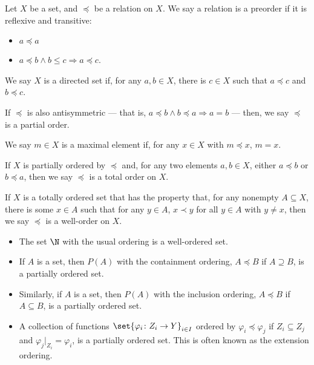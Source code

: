 \begin{definition}
Let $X$ be a set, and $\preceq $ be a relation on $X$. We say a relation is a preorder if it is reflexive and transitive:
\begin{itemize}
  \item $a\preceq a$
  \item $a\preceq b \wedge b\leq c\Rightarrow a\preceq c$.
\end{itemize}
We say $X$ is a directed set if, for any $a,b\in X$, there is $c\in X$ such that $a\preceq c$ and $b\preceq c$.\newline

If $\preceq$ is also antisymmetric --- that is, $a\preceq b\wedge b\preceq a \Rightarrow a = b$ --- then, we say $\preceq$ is a partial order.\newline

We say $m\in X$ is a maximal element if, for any $x\in X$ with $m\preceq x$, $m = x$.\newline

If $X$ is partially ordered by $\preceq$ and, for any two elements $a,b\in X$, either $a\preceq b$ or $b\preceq a$, then we say $\preceq$ is a total order on $X$.\newline

If $X$ is a totally ordered set that has the property that, for any nonempty $A\subseteq X$, there is some $x\in A$ such that for any $y\in A$, $x\prec y$ for all $y \in A$ with $y\neq x$, then we say $\preceq$ is a well-order on $X$.
\end{definition}
\begin{example}
  \begin{itemize}
    \item The set $\N$ with the usual ordering is a well-ordered set.
    \item If $A$ is a set, then $P(A)$ with the containment ordering, $A\preceq B$ if $A\supseteq B$, is a partially ordered set.
    \item Similarly, if $A$ is a set, then $P(A)$ with the inclusion ordering, $A\preceq B$ if $A\subseteq B$, is a partially ordered set.
    \item A collection of functions $\set{\varphi_{i}\colon Z_i\rightarrow Y}_{i\in I}$ ordered by $\varphi_{i}\preceq \varphi_j$ if $Z_i\subseteq Z_j$ and $\varphi_{j}|_{Z_i} = \varphi_i$, is a partially ordered set. This is often known as the extension ordering.
  \end{itemize}
\end{example}

